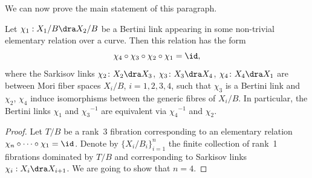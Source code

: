 We can now prove the main statement of this paragraph.

\begin{prop}\label{prop: relation form}
Let $\chi_1: X_1/B\dra X_2/B$ be a Bertini link appearing in some non-trivial elementary relation over a curve. Then this relation has the form
\[
\chi_4\circ\chi_3\circ\chi_2\circ \chi_1=\id,
\]
where the Sarkisov links $\chi_2\colon X_2\dra X_3$, $\chi_3\colon X_3\dra X_4$, $\chi_4\colon X_4\dra X_1$ are between Mori fiber spaces $X_i/B$, $i=1,2,3,4$, such that $\chi_3$ is a Bertini link and $\chi_2$, $\chi_4$ induce isomorphisms between the generic fibres of $X_i/B$. In particular, the Bertini links $\chi_1$ and ${\chi_3}^{-1}$ are equivalent via ${\chi_4}^{-1}$ and $\chi_2$.
\end{prop}
\begin{proof}
Let $T/B$ be a rank~$3$ fibration corresponding to an elementary relation $\chi_n\circ\cdots\circ\chi_1=\id$. Denote by $\{X_i/B_i\}_{i=1}^n$ the finite collection of rank~1 fibrations dominated by $T/B$ and corresponding to Sarkisov links $\chi_i: X_i\dra X_{i+1}$. We are going to show that $n=4$.


\end{proof}
